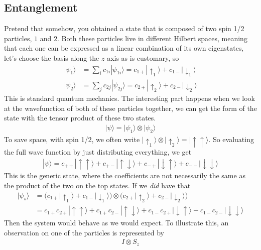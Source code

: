 \subsection{Entanglement}
Pretend that somehow, you obtained a state that is composed of two spin 1/2 particles, $1$ and $2$. Both these particles live in different Hilbert spaces, meaning that each one can be expressed as a linear combination of its own eigenstates, let's choose the basis along the $z$ axis as is customary, so
\begin{align}
    |\psi_1 \rangle &= \sum_i c_{1i} | \psi_{1i}\rangle  = c_{1+} |\uparrow_1\rangle + c_{1-}|\downarrow_1\rangle\\
    |\psi_2 \rangle &= \sum_j c_{2j} | \psi_{2j}\rangle  = c_{2+} |\uparrow_2\rangle + c_{2-}|\downarrow_2\rangle
\end{align}
This is standard quantum mechanics. The interesting part happens when we look at the wavefunction of both of these particles together, we can get the form of the state with  the tensor product of these two states.
\begin{align}
    |\psi\rangle = |\psi_1\rangle \otimes |\psi_2\rangle
\end{align}
To save space, with spin 1/2, we often write $|\uparrow_1\rangle \otimes |\uparrow_2\rangle  = |\uparrow\uparrow \rangle$. So evaluating the full wave function by just distributing everything, we get
\begin{align}
    |\psi\rangle = c_{++}|\uparrow\uparrow\rangle + c_{+-}|\uparrow\downarrow\rangle + c_{-+}|\downarrow\uparrow\rangle + c_{--}|\downarrow\downarrow\rangle
\end{align}
This is the generic state, where the coefficients are not necessarily the same as the product of the two on the top states. If we \emph{did} have that 
\begin{align}
    |\psi_s\rangle &= \Big(c_{1+} |\uparrow_1\rangle + c_{1-}|\downarrow_1\rangle\Big) \otimes \Big(c_{2+} |\uparrow_2\rangle + c_{2-}|\downarrow_2\rangle\Big)\\ \label{separablewave} 
    &= c_{1+}c_{2+}  |\uparrow\uparrow\rangle + c_{1+} c_{2-}|\uparrow\downarrow\rangle + c_{1-}c_{2+}|\downarrow\uparrow\rangle +  c_{1-}c_{2-}|\downarrow\downarrow\rangle
\end{align}
Then the system would behave as we would expect. To illustrate this, an observation on one of the particles is represented by 
\begin{align}
    I\otimes S_z
\end{align}
